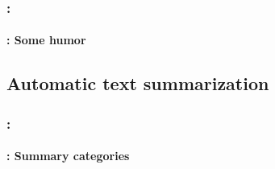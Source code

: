 \documentclass[xcolor=table]{beamer}
\begin{document}
\begin{frame}
	\frametitle{\insertshortsubtitle: \insertsection}
	\framesubtitle{\insertsubsection: Some humor}
	
	\begin{center}
	\end{center}
	
\end{frame}

\subsection{Automatic text summarization}

\begin{frame}
	\frametitle{\insertshortsubtitle: \insertsection}
	\framesubtitle{\insertsubsection: Summary categories}
	
	
\end{frame}
\end{document}
